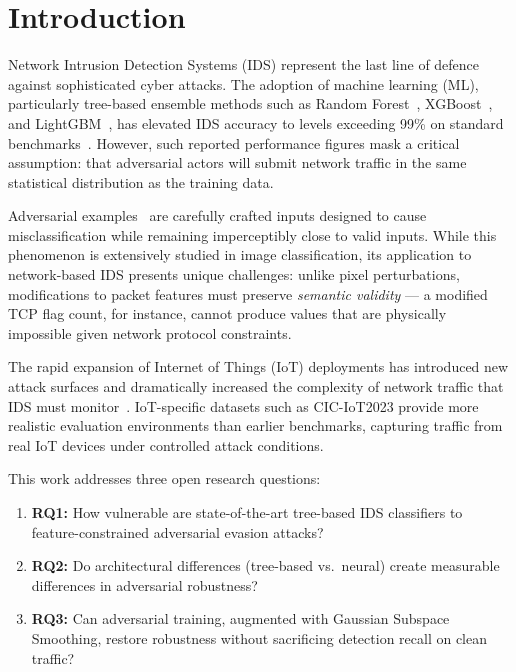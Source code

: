 \documentclass[review,12pt]{elsarticle}
\begin{document}
\linenumbers

\section{Introduction}
\label{sec:intro}

Network Intrusion Detection Systems (IDS) represent the last line of defence against sophisticated cyber attacks. The adoption of machine learning (ML), particularly tree-based ensemble methods such as Random Forest~\cite{breiman2001random}, XGBoost~\cite{chen2016xgboost}, and LightGBM~\cite{ke2017lightgbm}, has elevated IDS accuracy to levels exceeding 99\% on standard benchmarks~\cite{ring2019survey}. However, such reported performance figures mask a critical assumption: that adversarial actors will submit network traffic in the same statistical distribution as the training data.

Adversarial examples~\cite{goodfellow2014explaining} are carefully crafted inputs designed to cause misclassification while remaining imperceptibly close to valid inputs. While this phenomenon is extensively studied in image classification, its application to network-based IDS presents unique challenges: unlike pixel perturbations, modifications to packet features must preserve \emph{semantic validity} --- a modified TCP flag count, for instance, cannot produce values that are physically impossible given network protocol constraints.

The rapid expansion of Internet of Things (IoT) deployments has introduced new attack surfaces and dramatically increased the complexity of network traffic that IDS must monitor~\cite{hassanin2023iot}. IoT-specific datasets such as CIC-IoT2023 provide more realistic evaluation environments than earlier benchmarks, capturing traffic from real IoT devices under controlled attack conditions.

This work addresses three open research questions:
\begin{enumerate}
    \item \textbf{RQ1:} How vulnerable are state-of-the-art tree-based IDS classifiers to feature-constrained adversarial evasion attacks?
    \item \textbf{RQ2:} Do architectural differences (tree-based vs.\ neural) create measurable differences in adversarial robustness?
    \item \textbf{RQ3:} Can adversarial training, augmented with Gaussian Subspace Smoothing, restore robustness without sacrificing detection recall on clean traffic?
\end{enumerate}
\end{document}

